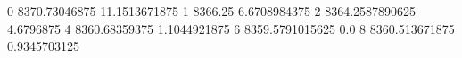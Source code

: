 0 8370.73046875 11.1513671875
1 8366.25 6.6708984375
2 8364.2587890625 4.6796875
4 8360.68359375 1.1044921875
6 8359.5791015625 0.0
8 8360.513671875 0.9345703125
